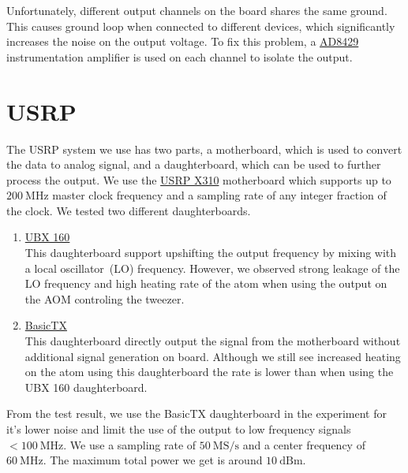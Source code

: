 Unfortunately, different output channels on the board shares the same ground.
This causes ground loop when connected to different devices,
which significantly increases the noise on the output voltage.
To fix this problem, a \href{https://www.analog.com/en/products/ad8429.html}{AD8429}
instrumentation amplifier is used on each channel to isolate the output.

\section{USRP}
\label{appendex:computer-control:usrp}

The USRP system we use has two parts,
a motherboard, which is used to convert the data to analog signal,
and a daughterboard, which can be used to further process the output.
We use the \href{https://www.ettus.com/all-products/x310-kit/}{USRP X310}
motherboard which supports up to $200~\mathrm{MHz}$ master clock frequency
and a sampling rate of any integer fraction of the clock.
We tested two different daughterboards.
\begin{enumerate}
\item \href{https://www.ettus.com/all-products/ubx160/}{UBX 160}\\
  This daughterboard support upshifting the output frequency
  by mixing with a local oscillator~(LO) frequency.
  However, we observed strong leakage of the LO frequency
  and high heating rate of the atom when using the output on the AOM controling the tweezer.
\item \href{https://www.ettus.com/all-products/basictx/}{BasicTX}\\
  This daughterboard directly output the signal from the motherboard
  without additional signal generation on board.
  Although we still see increased heating on the atom using this daughterboard
  the rate is lower than when using the UBX 160 daughterboard.
\end{enumerate}
From the test result, we use the BasicTX daughterboard in the experiment
for it's lower noise and limit the use of the output
to low frequency signals $<\!100~\mathrm{MHz}$.
We use a sampling rate of $50~\mathrm{MS/s}$ and a center frequency of $60~\mathrm{MHz}$.
The maximum total power we get is around $10~\mathrm{dBm}$.

